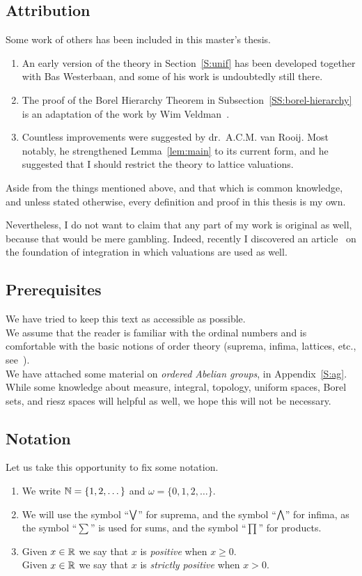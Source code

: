 \documentclass[main.tex]{subfiles}
\begin{document}
\subsection{Attribution}
Some work of others has been included in this master's thesis.
\begin{enumerate}
\item
An early version of the theory in Section~\ref{S:unif}
has been developed together with Bas Westerbaan,
and some of his work is undoubtedly still there.
\item
The proof of the Borel Hierarchy Theorem
in Subsection~\ref{SS:borel-hierarchy}
is an adaptation of the work by Wim Veldman~\cite{Veldman08}.
\item
Countless improvements 
were suggested by dr.~A.C.M. van Rooij.
Most notably,
he strengthened Lemma~\ref{lem:main}
to its current form,
and he suggested that I should restrict the theory  to
lattice valuations.
\end{enumerate}
Aside from the things mentioned above,
and that which is common knowledge,
and unless stated otherwise,
every definition and proof in this thesis is my own.

Nevertheless,
I do not want to
claim 
that any part of my work is original as well,
because that would be mere gambling.
Indeed,
recently I discovered
an article~\cite{Alfsen63}
on the foundation of integration
in which 
 valuations
are used as well.

\subsection{Prerequisites}
We have tried to keep this text as accessible as possible.\\
We assume that
the reader is familiar
with the ordinal numbers
and is comfortable with the basic notions
of order theory (suprema, infima, lattices, etc., see~\cite{DP02}).\\
We have attached some material on \emph{ordered Abelian groups},
in Appendix~\ref{S:ag}.\\
While some knowledge
about measure, integral,
topology,
uniform spaces, 
Borel sets,
and riesz spaces will helpful as well,
we hope this will not be necessary.

\subsection{Notation}
Let us take this opportunity to fix some notation.
\begin{enumerate}
\item
We write $\mathbb{N}=\{1,2,\dotsc\}$ and $\omega=\{0,1,2,\dotsc\}$.
\item
We will use the symbol ``$\textstyle{\bigvee}$'' for suprema,
and the symbol ``$\textstyle{\bigwedge}$'' for infima,
as the symbol ``$\sum$'' is used for sums,
and the symbol ``$\prod$'' for products.
\item
Given  $x\in \mathbb{R}$ we say that $x$ is \emph{positive}
when $x \geq 0$.\\
Given  $x\in \mathbb{R}$ we say that $x$ is \emph{strictly positive}
when $x > 0$.\\
\end{enumerate}
\end{document}
